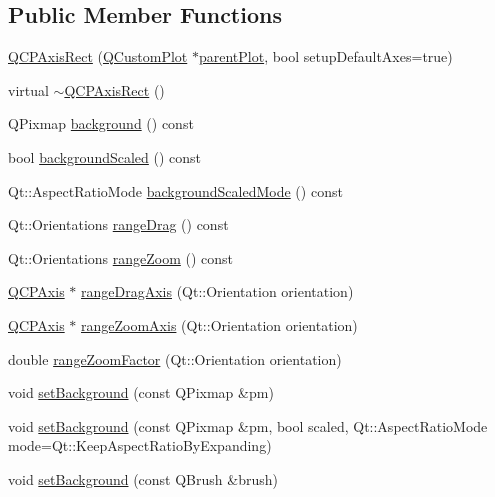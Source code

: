 \subsection*{Public Member Functions}
\begin{DoxyCompactItemize}
\item 
\hyperlink{class_q_c_p_axis_rect_a60b31dece805462c1b82eea2e69ba042}{Q\+C\+P\+Axis\+Rect} (\hyperlink{class_q_custom_plot}{Q\+Custom\+Plot} $\ast$\hyperlink{class_q_c_p_layerable_ab7e0e94461566093d36ffc0f5312b109}{parent\+Plot}, bool setup\+Default\+Axes=true)
\item 
virtual \hyperlink{class_q_c_p_axis_rect_a463c44b1856ddbf82eb3f7b582839cd0}{$\sim$\+Q\+C\+P\+Axis\+Rect} ()
\item 
Q\+Pixmap \hyperlink{class_q_c_p_axis_rect_a0daa1dadd2a62dbfa37b7f742edd0059}{background} () const 
\item 
bool \hyperlink{class_q_c_p_axis_rect_a67c18777b88fe9c81dee3dd2b5f50e5c}{background\+Scaled} () const 
\item 
Qt\+::\+Aspect\+Ratio\+Mode \hyperlink{class_q_c_p_axis_rect_a3d0f42d6be11a0b3d4576402a2b0032d}{background\+Scaled\+Mode} () const 
\item 
Qt\+::\+Orientations \hyperlink{class_q_c_p_axis_rect_af24b46954ce27a26b23770cdb8319080}{range\+Drag} () const 
\item 
Qt\+::\+Orientations \hyperlink{class_q_c_p_axis_rect_a3397fc60e5df29089090bc236e9f05f6}{range\+Zoom} () const 
\item 
\hyperlink{class_q_c_p_axis}{Q\+C\+P\+Axis} $\ast$ \hyperlink{class_q_c_p_axis_rect_a6d7c22cfc54fac7a3d6ef80b133a8574}{range\+Drag\+Axis} (Qt\+::\+Orientation orientation)
\item 
\hyperlink{class_q_c_p_axis}{Q\+C\+P\+Axis} $\ast$ \hyperlink{class_q_c_p_axis_rect_a679c63f2b8daccfe6ec5110dce3dd3b6}{range\+Zoom\+Axis} (Qt\+::\+Orientation orientation)
\item 
double \hyperlink{class_q_c_p_axis_rect_ae4e6c4d143aacc88d2d3c56f117c2fe1}{range\+Zoom\+Factor} (Qt\+::\+Orientation orientation)
\item 
void \hyperlink{class_q_c_p_axis_rect_af615ab5e52b8e0a9a0eff415b6559db5}{set\+Background} (const Q\+Pixmap \&pm)
\item 
void \hyperlink{class_q_c_p_axis_rect_ac48a2d5d9b7732e73b86605c69c5e4c1}{set\+Background} (const Q\+Pixmap \&pm, bool scaled, Qt\+::\+Aspect\+Ratio\+Mode mode=Qt\+::\+Keep\+Aspect\+Ratio\+By\+Expanding)
\item 
void \hyperlink{class_q_c_p_axis_rect_a22a22b8668735438dc06f9a55fe46b33}{set\+Background} (const Q\+Brush \&brush)

\end{DoxyCompactItemize}
